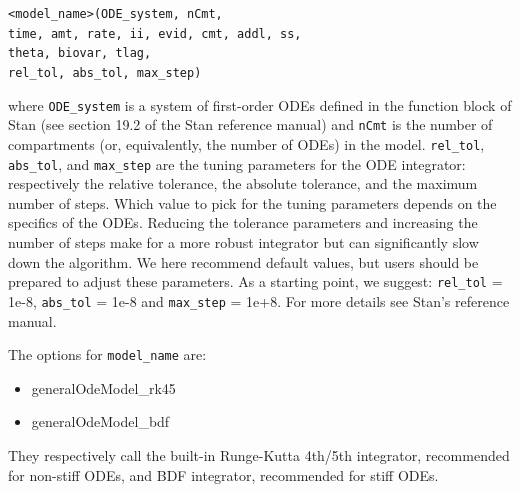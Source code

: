 \documentclass[11pt]{amsart}
\begin{document}
\texttt{<model\_name>(ODE\_system, nCmt, \\
\phantom{<model\_name>} time, amt, rate, ii, evid, cmt, addl, ss, \\
\phantom{<model\_name>} theta, biovar, tlag, \\                              
\phantom{<model\_name>} rel\_tol, abs\_tol, max\_step)}
                              
where \texttt{ODE\_system} is a system of first-order ODEs defined in the function block of Stan (see section 19.2 of the Stan reference manual) and \texttt{nCmt} is the number of compartments (or, equivalently, the number of ODEs) in the model. \texttt{rel\_tol}, \texttt{abs\_tol}, and \texttt{max\_step} are the tuning parameters for the ODE integrator: respectively the relative tolerance, the absolute tolerance, and the maximum number of steps. Which value to pick for the tuning parameters depends on the specifics of the ODEs. Reducing the tolerance parameters and increasing the number of steps make for a more robust integrator but can significantly slow down the algorithm. We here recommend default values, but users should be prepared to adjust these parameters. As a starting point, we suggest:  \texttt{rel\_tol} = 1e-8, \texttt{abs\_tol} = 1e-8 and \texttt{max\_step} = 1e+8. For more details see Stan's reference manual.

The options for \texttt{model\_name} are:
\begin{itemize}
  \item generalOdeModel\_rk45
  \item generalOdeModel\_bdf
\end{itemize}

They respectively call the built-in Runge-Kutta 4th/5th integrator, recommended for non-stiff ODEs, and BDF integrator, recommended for stiff ODEs.
\end{document}

